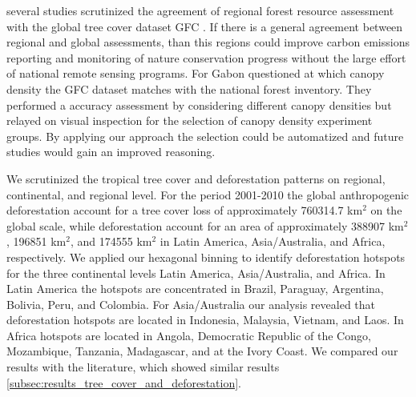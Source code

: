 several studies scrutinized the agreement of regional forest resource assessment with the global tree cover dataset \ac{GFC} \citep{Sannier2016,McRoberts2016,Gross2017}. If there is a general agreement between regional and global assessments, than this regions could improve carbon emissions reporting and monitoring of nature conservation progress without the large effort of national remote sensing programs. For Gabon \citet{Sannier2016} questioned at which canopy density the \ac{GFC} dataset matches with the national forest inventory. They performed a accuracy assessment by considering different canopy densities but relayed on visual inspection for the selection of canopy density experiment groups. By applying our approach the selection could be automatized and future studies would gain an improved reasoning.

		We scrutinized the tropical tree cover and deforestation patterns on regional, continental, and regional level. For the period 2001-2010 the global anthropogenic deforestation account for a tree cover loss of approximately 760314.7 km$^2$ on the global scale, while deforestation account for an area of approximately 388907 km$^2$, 196851 km$^2$, and 174555 km$^2$ in Latin America, Asia/Australia, and Africa, respectively. We applied our hexagonal binning to identify deforestation hotspots for the three continental levels Latin America, Asia/Australia, and Africa. In Latin America the hotspots are concentrated in Brazil, Paraguay, Argentina, Bolivia, Peru, and Colombia. For Asia/Australia our analysis revealed that deforestation hotspots are located in Indonesia, Malaysia, Vietnam, and Laos. In Africa hotspots are located in Angola, Democratic Republic of the Congo, Mozambique, Tanzania, Madagascar, and at the Ivory Coast. We compared our results with the literature, which showed similar results \ref{subsec:results_tree_cover_and_deforestation}.


